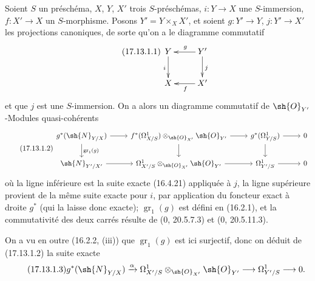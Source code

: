 \begin{env}[17.13.1]
\label{IV.17.13.1}
Soient $S$ un préschéma, $X$, $Y$, $X'$ trois $S$-préschémas, $i:Y\to X$ une $S$-immersion, $f:X'\to X$ un $S$-morphisme. Posons $Y'=Y\times_XX'$, et soient $g:Y'\to Y$, $j:Y'\to X'$ les projections canoniques, de sorte qu'on a le diagramme commutatif
\[
\label{IV.17.13.1.1}
\tag{17.13.1.1}
\xymatrix{
  Y \ar[d]_i & Y' \ar[l]_g \ar[d]^j\\
  X & X' \ar[l]^f
}
\]
et que $j$ est une $S$-immersion. On a alors un diagramme commutatif de $\sh{O}_{Y'}$-Modules quasi-cohérents
\[
\label{IV.17.13.1.2}
\tag{17.13.1.2}
\begin{tikzcd}
  g^*(\sh{N}_{Y/X}) \ar{r} \ar{d}{\operatorname{gr}_1(g)} & f^*(\Omega^1_{X/S})\otimes_{\sh{O}_{X'}}\sh{O}_{Y'} \ar{r} \ar{d} & g^*(\Omega^1_{Y/S}) \ar{r} \ar{d} & 0\\
  \sh{N}_{Y'/X'} \ar{r} & \Omega^1_{X'/S}\otimes_{\sh{O}_{X'}}\sh{O}_{Y'} \ar{r} & \Omega^1_{Y'/S} \ar{r} & 0
\end{tikzcd}
\]
où la ligne inférieure est la suite exacte (16.4.21) appliquée à $j$, la ligne supérieure provient de la même suite exacte pour $i$, par application du foncteur exact à droite $g^*$ (qui la laisse donc exacte); $\operatorname{gr}_1(g)$ est défini en (16.2.1), et la commutativité des deux carrés résulte de (0, 20.5.7.3) et (0, 20.5.11.3).


On a vu en outre (16.2.2, (iii)) que $\operatorname{gr}_1(g)$ est ici surjectif, donc on déduit de (17.13.1.2) la suite exacte
\[
\label{IV.17.13.1.3}
\tag{17.13.1.3}
g^*(\sh{N}_{Y/X})\xrightarrow{\alpha}\Omega^1_{X'/S}\otimes_{\sh{O}_{X'}}\sh{O}_{Y'}\to\Omega^1_{Y'/S}\to0.
\]
\end{env}

